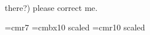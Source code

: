 %
%
%
		there?) please correct me.

\font\sevenrm=cmr7			%
\font\twelvebf=cmbx10 scaled 	%
\font\forteenrm=cmr10 scaled 	%

\def\Head#1{\def\Header{#1}}
\def\Header{\null}

\def\File#1,#2,#3{\vfill\eject\mark{\empty}
\global\linecount=0\linenext=9\pageno=1\message{#1}
\headline={\twelvebf\Header\hfil
\edef\a{\topmark}\edef\b{\botmark}\edef\c{\firstmark}
\ifx\c\empty\botmark\else
\ifx\a\empty\botmark\else
\ifx\b\empty\topmark\else
\ifx\a\b\topmark\else\topmark--\botmark\fi
\fi\fi\fi(#1)}
\footline={\it{}#2 #3\hfil{}Page \folio{} of #1}}

\def\Proc#1{\global\def\Procname{#1}\global\setbox\procbox=\hbox{\forteenrm #1}}
\def\ProcCont#1{\global\def\Procname{#1}
\global\setbox\procbox=\hbox{\forteenrm$\ldots$#1}}
\newbox\procbox
\def\Procname{\null}

